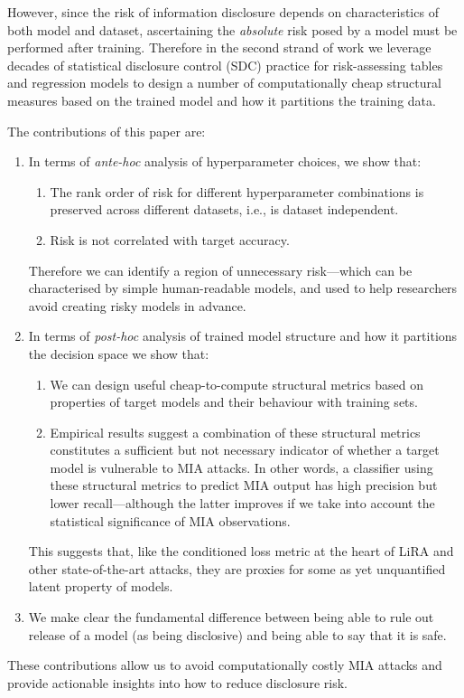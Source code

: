 However, since the risk of information disclosure depends on characteristics of both model and dataset, ascertaining the \textit{absolute} risk posed by a model must be performed after training. Therefore in the second strand of work we leverage decades of statistical disclosure control (SDC) practice for risk-assessing tables and regression models to design a number of computationally cheap structural measures based on the trained model and how it partitions the training data.

The contributions of this paper are:

\begin{enumerate}
    \item{In terms of \textit{ante-hoc} analysis of hyperparameter choices, we show that:}
        \begin{enumerate}
            \item The rank order of risk for different hyperparameter combinations is preserved across different datasets, i.e., is dataset independent.
            \item Risk is not correlated with target accuracy. 
        \end{enumerate}
        Therefore we can identify a region of unnecessary risk---which can be characterised by simple human-readable models, and used to help researchers avoid creating risky models in advance.
    \item In terms of \textit{post-hoc} analysis of trained model structure and how it partitions the decision space we show that:
        \begin{enumerate}
            \item We can design useful cheap-to-compute structural metrics based on properties of target models and their behaviour with training sets. 
            \item Empirical results suggest a combination of these structural metrics constitutes a sufficient but not necessary indicator of whether a target model is vulnerable to MIA attacks. In other words, a classifier using these structural metrics to predict MIA output has high precision but lower recall---although the latter improves if we take into account the statistical significance of MIA observations.
        \end{enumerate}
        This suggests that, like the conditioned loss metric at the heart of LiRA and other state-of-the-art attacks, they are proxies for some as yet unquantified latent property of models. 
    \item We make clear the fundamental difference between being able to rule out release of a model (as being disclosive) and being able to say that it is safe.
\end{enumerate}

These contributions allow us to avoid computationally costly MIA attacks and provide actionable insights into how to reduce disclosure risk.
